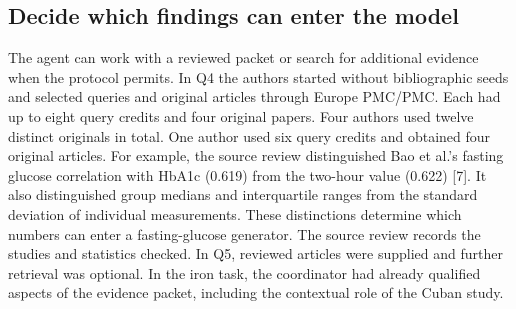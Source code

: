 \documentclass[11pt,letterpaper]{article}
\begin{document}
\subsection{Decide which findings can enter the model}

The agent can work with a reviewed packet or search for additional evidence when the protocol permits. In Q4 the authors started without bibliographic seeds and selected queries and original articles through Europe PMC/\allowbreak{}PMC. Each had up to eight query credits and four original papers. Four authors used twelve distinct originals in total. One author used six query credits and obtained four original articles. For example, the source review distinguished Bao et al.'s fasting glucose correlation with HbA1c (0.619) from the two-hour value (0.622) [7]. It also distinguished group medians and interquartile ranges from the standard deviation of individual measurements. These distinctions determine which numbers can enter a fasting-glucose generator. The source review records the studies and statistics checked. In Q5, reviewed articles were supplied and further retrieval was optional. In the iron task, the coordinator had already qualified aspects of the evidence packet, including the contextual role of the Cuban study.


\FloatBarrier

\begingroup

\small

\renewcommand{\arraystretch}{1.22}
\end{document}
